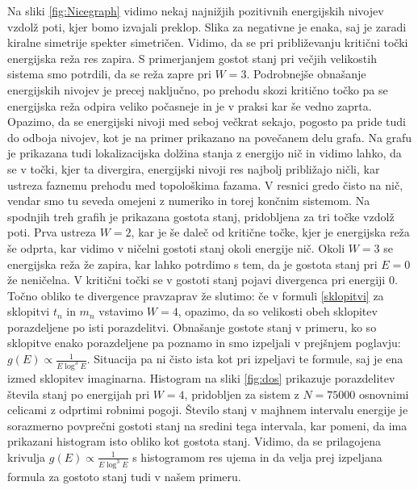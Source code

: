 Na sliki \ref{fig:Nicegraph} vidimo nekaj najnižjih pozitivnih energijskih nivojev vzdolž poti, kjer bomo izvajali preklop. Slika za negativne je enaka, saj je zaradi kiralne simetrije spekter simetričen. Vidimo, da se pri približevanju kritični točki energijska reža res zapira. S primerjanjem gostot stanj pri večjih velikostih sistema smo potrdili, da se reža zapre pri $W=3$. Podrobnejše obnašanje energijskih nivojev je precej naključno, po prehodu skozi kritično točko pa se energijska reža odpira veliko počasneje in je v praksi kar še vedno zaprta. Opazimo, da se energijski nivoji med seboj večkrat sekajo, pogosto pa pride tudi do odboja nivojev, kot je na primer prikazano na povečanem delu grafa.
Na grafu je prikazana tudi lokalizacijska dolžina stanja z energijo nič in vidimo lahko, da se v točki, kjer ta divergira, energijski nivoji res najbolj približajo ničli, kar ustreza faznemu prehodu med topološkima fazama. V resnici gredo čisto na nič, vendar smo tu seveda omejeni z numeriko in torej končnim sistemom. 
Na spodnjih treh grafih je prikazana gostota stanj, pridobljena za tri točke vzdolž poti. Prva ustreza $W=2$, kar je še daleč od kritične točke, kjer je energijska reža še odprta, kar vidimo v ničelni gostoti stanj okoli energije nič. Okoli $W=3$ se energijska reža že zapira, kar lahko potrdimo s tem, da je gostota stanj pri $E=0$ že neničelna. V kritični točki se v gostoti stanj pojavi divergenca pri energiji $0$. Točno obliko te divergence pravzaprav že slutimo: če v formuli \ref{sklopitvi} za sklopitvi $t_n$ in $m_n$ vstavimo $W=4$, opazimo, da so velikosti obeh sklopitev porazdeljene po isti porazdelitvi. Obnašanje gostote stanj v primeru, ko so sklopitve enako porazdeljene pa poznamo in smo izpeljali v prejšnjem poglavju: $g(E) \propto \frac{1}{E \log^3 E}$.
Situacija pa ni čisto ista kot pri izpeljavi te formule, saj je ena izmed sklopitev imaginarna. Histogram na sliki \ref{fig:dos} prikazuje porazdelitev števila stanj po energijah pri $W=4$, pridobljen za sistem z $N=75000$ osnovnimi celicami z odprtimi robnimi pogoji. Število stanj v majhnem intervalu energije je sorazmerno povprečni gostoti stanj na sredini tega intervala, kar pomeni, da ima prikazani histogram isto obliko kot gostota stanj. Vidimo, da se prilagojena krivulja $g(E) \propto \frac{1}{E \log^3 E}$ s histogramom res ujema in da velja prej izpeljana formula za gostoto stanj tudi v našem primeru.

